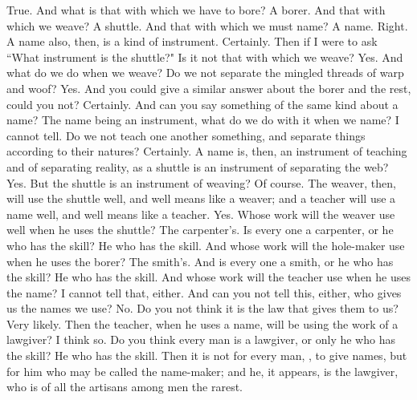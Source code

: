 True.
\socratesspeaks
And what is that with which we have to bore?
\hermogenesspeaks
A borer.
\socratesspeaks
And that with which we weave?
\hermogenesspeaks
A shuttle.
\socratesspeaks
And that with which we must name?
\hermogenesspeaks
A name.
\socratesspeaks
Right. A name also, then, is a kind of instrument.
\hermogenesspeaks
Certainly.
\socratesspeaks
Then if I were to ask ``What instrument is the shuttle?" Is it not that with which we weave?
\hermogenesspeaks
Yes. 
\socratesspeaks
And what do we do when we weave? Do we not separate the mingled threads of warp and woof?
\hermogenesspeaks
Yes.
\socratesspeaks
And you could give a similar answer about the borer and the rest, could you not?
\hermogenesspeaks
Certainly.
\socratesspeaks
And can you say something of the same kind about a name? The name being an instrument, what do we do with it when we name?
\hermogenesspeaks
I cannot tell.
\socratesspeaks
Do we not teach one another something, and separate things according to their natures?
\hermogenesspeaks
Certainly.
\socratesspeaks
A name is, then, an instrument of teaching and of separating reality,  as a shuttle is an instrument of separating the web?
\hermogenesspeaks
Yes.
\socratesspeaks
But the shuttle is an instrument of weaving?
\hermogenesspeaks
Of course.
\socratesspeaks
The weaver, then, will use the shuttle well, and well means like a weaver; and a teacher will use a name well, and well means like a teacher.
\hermogenesspeaks
Yes.
\socratesspeaks
Whose work will the weaver use well when he uses the shuttle?
\hermogenesspeaks
The carpenter's.
\socratesspeaks
Is every one a carpenter, or he who has the skill?
\hermogenesspeaks
He who has the skill. 
\socratesspeaks
And whose work will the hole-maker use when he uses the borer?
\hermogenesspeaks
The smith's.
\socratesspeaks
And is every one a smith, or he who has the skill?
\hermogenesspeaks
He who has the skill.
\socratesspeaks
And whose work will the teacher use when he uses the name?
\hermogenesspeaks
I cannot tell that, either.
\socratesspeaks
And can you not tell this, either, who gives us the names we use?
\hermogenesspeaks
No.
\socratesspeaks
Do you not think it is the law that gives them to us?
\hermogenesspeaks
Very likely. 
\socratesspeaks
Then the teacher, when he uses a name, will be using the work of a lawgiver?
\hermogenesspeaks
I think so.
\socratesspeaks
Do you think every man is a lawgiver, or only he who has the skill?
\hermogenesspeaks
He who has the skill.
\socratesspeaks
Then it is not for every man, \hermogenesspeaks,  to give names, but for him who may be called the name-maker; and he, it appears, is the lawgiver, who is of all the artisans among men the rarest.
